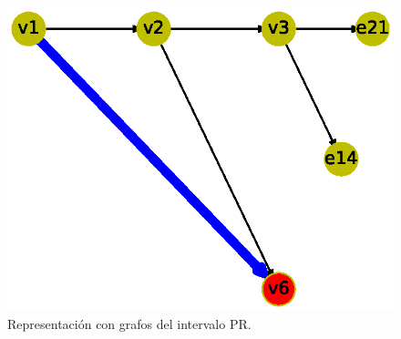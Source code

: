 \documentclass{article}
\begin{document}
\begin{figure}
  \centering 
  \includegraphics[width=.8\columnwidth]{fig12.eps}
  \caption{Representación con grafos del intervalo PR.}
  \label{Figura 12}
\end{figure}





\newpage


\end{document}
